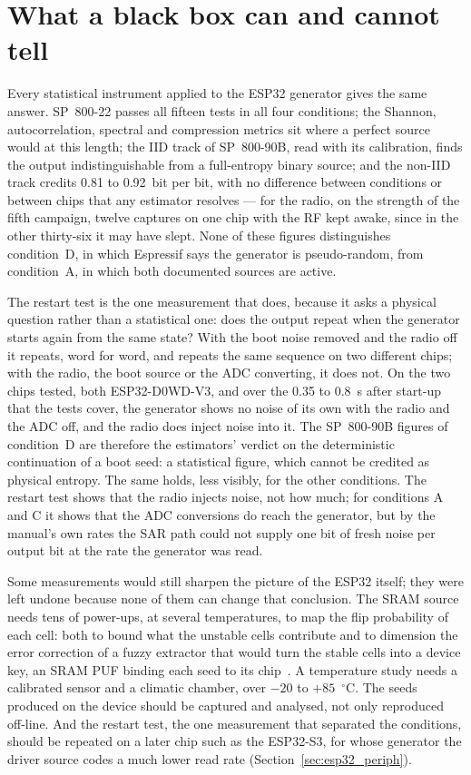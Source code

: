 \section{What a black box can and cannot tell}
\label{sec:esp32_lessons}

Every statistical instrument applied to the ESP32 generator gives the
same answer. SP~800-22 passes all fifteen tests in all four conditions;
the Shannon, autocorrelation, spectral and compression metrics sit where
a perfect source would at this length; the IID track of SP~800-90B, read
with its calibration, finds the output indistinguishable from a
full-entropy binary source; and the non-IID track credits 0.81 to
0.92~bit per bit, with no difference between conditions or between chips
that any estimator resolves --- for the radio, on the strength of the
fifth campaign, twelve captures on one chip with the RF kept awake,
since in the other thirty-six it may have slept. None of these figures distinguishes
condition~D, in which Espressif says the generator is pseudo-random, from
condition~A, in which both documented sources are active.

The restart test is the one measurement that does, because it asks a
physical question rather than a statistical one: does the output repeat
when the generator starts again from the same state? With the boot noise
removed and the radio off it repeats, word for word, and repeats the same
sequence on two different chips; with the radio, the boot source or the
ADC converting, it does not. On the two chips tested, both ESP32-D0WD-V3,
and over the 0.35 to 0.8~s after start-up that the tests cover, the
generator shows no noise of its own with the radio and the
ADC off, and the radio does inject noise into it. The SP~800-90B figures
of condition~D are therefore the estimators' verdict on the deterministic
continuation of a boot seed: a statistical figure, which cannot be
credited as physical entropy. The same holds, less visibly, for the other
conditions. The restart test shows that the radio injects noise, not how
much; for conditions A and C it shows that the ADC conversions do reach
the generator, but by the manual's own rates the SAR path could not
supply one bit of fresh noise per output bit at the rate the generator
was read.

Some measurements would still sharpen the picture of the ESP32 itself;
they were left undone because none of them can change that conclusion.
The SRAM source needs tens of power-ups, at several temperatures, to map
the flip probability of each cell: both to bound what the unstable cells
contribute and to dimension the error correction of a fuzzy extractor
that would turn the stable cells into a device key, an SRAM \ac{PUF}
binding each seed to its chip~\cite{holcomb_2009_powerup}. A temperature
study needs a calibrated sensor and a climatic chamber, over
$-20$ to $+85$~$^\circ$C. The seeds produced on the device should be
captured and analysed, not only reproduced off-line. And the restart
test, the one measurement that separated the conditions, should be
repeated on a later chip such as the ESP32-S3, for whose generator the
driver source codes a much lower read rate
(Section~\ref{sec:esp32_periph}).

